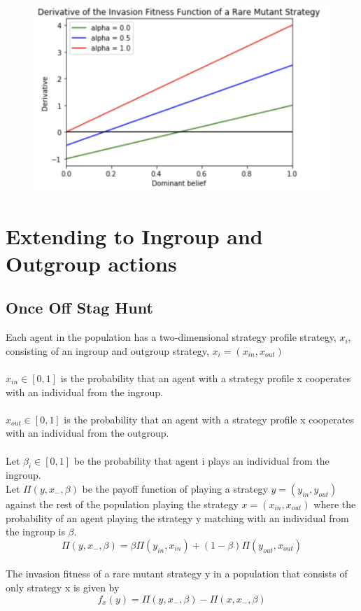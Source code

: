 \documentclass[]{llncs}
\begin{document}
\begin{figure}
\centering
\includegraphics[width=12cm]{images/invasion_fitness_alpha}
\end{figure}

\section{Extending to Ingroup and Outgroup actions}

\subsection{Once Off Stag Hunt}

Each agent in the population has a two-dimensional strategy profile strategy, $x_i$, consisting of an ingroup and outgroup strategy,  $x_i = (x_{in}, x_{out})$\\
\\
$x_{in} \in [0,1]$ is the probability that an agent with a strategy profile x cooperates with an individual from the ingroup. \\
\\
$x_{out} \in [0,1]$ is the probability that an agent with a strategy profile x cooperates with an individual from the outgroup. \\
\\
Let $\beta_i \in [0,1]$ be the probability that agent i plays an individual from the ingroup.\\

Let $ \Pi ( y, x_{-}, \beta)$ be the payoff function of playing a strategy $y = (y_{in}, y_{out}) $ against the rest of the population playing the strategy $x = (x_{in}, x_{out})$ where the probability of an agent playing the strategy y matching with an individual from the ingroup is $\beta$.
\[
\Pi ( y, x_{-} , \beta) = \beta \Pi ( y_{in}, x_{in}) + (1-\beta) \Pi ( y_{out}, x_{out} ) 
\]
\\
The invasion fitness of a rare mutant strategy y in a population that consists of only strategy x is given by 
\[
f_x(y) = \Pi ( y, x_{-} , \beta) - \Pi ( x, x_{-} , \beta) 
\]
\end{document}
